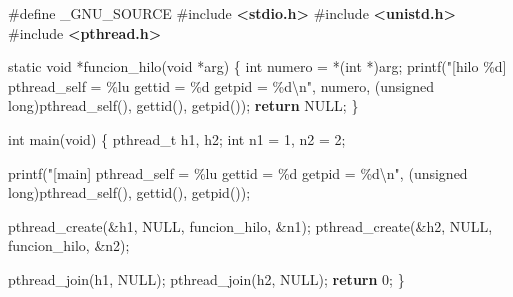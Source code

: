 \documentclass[
  spanish,
]{article}
\newenvironment{Shaded}{}{}
\newcommand{\ControlFlowTok}[1]{\textcolor[rgb]{0.00,0.44,0.13}{\textbf{#1}}}
\newcommand{\DataTypeTok}[1]{\textcolor[rgb]{0.56,0.13,0.00}{#1}}
\newcommand{\DecValTok}[1]{\textcolor[rgb]{0.25,0.63,0.44}{#1}}
\newcommand{\ImportTok}[1]{\textcolor[rgb]{0.00,0.50,0.00}{\textbf{#1}}}
\newcommand{\NormalTok}[1]{#1}
\newcommand{\OperatorTok}[1]{\textcolor[rgb]{0.40,0.40,0.40}{#1}}
\newcommand{\OtherTok}[1]{\textcolor[rgb]{0.00,0.44,0.13}{#1}}
\newcommand{\PreprocessorTok}[1]{\textcolor[rgb]{0.74,0.48,0.00}{#1}}
\newcommand{\SpecialCharTok}[1]{\textcolor[rgb]{0.25,0.44,0.63}{#1}}
\newcommand{\StringTok}[1]{\textcolor[rgb]{0.25,0.44,0.63}{#1}}
\begin{document}
\begin{Shaded}
\begin{Highlighting}[]
\PreprocessorTok{\#define }\OtherTok{\_GNU\_SOURCE}
\PreprocessorTok{\#include }\ImportTok{\textless{}stdio.h\textgreater{}}
\PreprocessorTok{\#include }\ImportTok{\textless{}unistd.h\textgreater{}}
\PreprocessorTok{\#include }\ImportTok{\textless{}pthread.h\textgreater{}}

\DataTypeTok{static} \DataTypeTok{void} \OperatorTok{*}\NormalTok{funcion\_hilo}\OperatorTok{(}\DataTypeTok{void} \OperatorTok{*}\NormalTok{arg}\OperatorTok{)} \OperatorTok{\{}
    \DataTypeTok{int}\NormalTok{ numero }\OperatorTok{=} \OperatorTok{*(}\DataTypeTok{int} \OperatorTok{*)}\NormalTok{arg}\OperatorTok{;}
\NormalTok{    printf}\OperatorTok{(}\StringTok{"[hilo }\SpecialCharTok{\%d}\StringTok{] pthread\_self = }\SpecialCharTok{\%lu}\StringTok{  gettid = }\SpecialCharTok{\%d}\StringTok{  getpid = }\SpecialCharTok{\%d\textbackslash{}n}\StringTok{"}\OperatorTok{,}
\NormalTok{           numero}\OperatorTok{,} \OperatorTok{(}\DataTypeTok{unsigned} \DataTypeTok{long}\OperatorTok{)}\NormalTok{pthread\_self}\OperatorTok{(),}\NormalTok{ gettid}\OperatorTok{(),}\NormalTok{ getpid}\OperatorTok{());}
    \ControlFlowTok{return}\NormalTok{ NULL}\OperatorTok{;}
\OperatorTok{\}}

\DataTypeTok{int}\NormalTok{ main}\OperatorTok{(}\DataTypeTok{void}\OperatorTok{)} \OperatorTok{\{}
\NormalTok{    pthread\_t h1}\OperatorTok{,}\NormalTok{ h2}\OperatorTok{;}
    \DataTypeTok{int}\NormalTok{ n1 }\OperatorTok{=} \DecValTok{1}\OperatorTok{,}\NormalTok{ n2 }\OperatorTok{=} \DecValTok{2}\OperatorTok{;}

\NormalTok{    printf}\OperatorTok{(}\StringTok{"[main]   pthread\_self = }\SpecialCharTok{\%lu}\StringTok{  gettid = }\SpecialCharTok{\%d}\StringTok{  getpid = }\SpecialCharTok{\%d\textbackslash{}n}\StringTok{"}\OperatorTok{,}
           \OperatorTok{(}\DataTypeTok{unsigned} \DataTypeTok{long}\OperatorTok{)}\NormalTok{pthread\_self}\OperatorTok{(),}\NormalTok{ gettid}\OperatorTok{(),}\NormalTok{ getpid}\OperatorTok{());}

\NormalTok{    pthread\_create}\OperatorTok{(\&}\NormalTok{h1}\OperatorTok{,}\NormalTok{ NULL}\OperatorTok{,}\NormalTok{ funcion\_hilo}\OperatorTok{,} \OperatorTok{\&}\NormalTok{n1}\OperatorTok{);}
\NormalTok{    pthread\_create}\OperatorTok{(\&}\NormalTok{h2}\OperatorTok{,}\NormalTok{ NULL}\OperatorTok{,}\NormalTok{ funcion\_hilo}\OperatorTok{,} \OperatorTok{\&}\NormalTok{n2}\OperatorTok{);}

\NormalTok{    pthread\_join}\OperatorTok{(}\NormalTok{h1}\OperatorTok{,}\NormalTok{ NULL}\OperatorTok{);}
\NormalTok{    pthread\_join}\OperatorTok{(}\NormalTok{h2}\OperatorTok{,}\NormalTok{ NULL}\OperatorTok{);}
    \ControlFlowTok{return} \DecValTok{0}\OperatorTok{;}
\OperatorTok{\}}
\end{Highlighting}
\end{Shaded}
\end{document}
